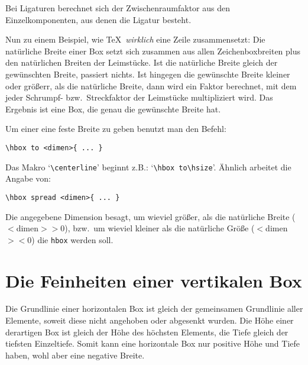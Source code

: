 Bei Ligaturen berechnet sich der
Zwischenraumfaktor aus den
Einzelkomponenten, aus denen die Ligatur besteht.

Nun zu einem Beispiel, wie \TeX\ {\em wirklich} eine Zeile
zusammensetzt: Die nat\"urliche Breite einer 
Box setzt sich zusammen aus
allen Zeichenboxbreiten plus den nat\"urlichen Breiten der Leimst\"ucke.
Ist die nat\"urliche Breite gleich der gew\"unschten Breite, passiert
nichts. Ist hingegen die gew\"unschte Breite kleiner oder gr\"o\ss{}err, als
die nat\"urliche Breite, dann wird ein Faktor berechnet, mit dem jeder
Schrumpf- bzw.\ Streckfaktor der Leimst\"ucke multipliziert wird. Das
Ergebnis ist eine Box, die genau die gew\"unschte Breite hat.

Um einer  eine feste Breite zu geben benutzt man den Befehl:
\begin{verbatim}
\hbox to <dimen>{ ... }
\end{verbatim}
Das Makro `\verb|\centerline|' beginnt z.B.: `\verb|\hbox to\hsize|'.
\"Ahnlich arbeitet die Angabe von:
\begin{verbatim}
\hbox spread <dimen>{ ... }
\end{verbatim}
Die angegebene 
Dimension besagt, um wieviel gr\"o\ss{}er, als die nat\"urliche
Breite ($<$dimen$> > 0$), bzw.\ um wieviel kleiner als die nat\"urliche
Gr\"o\ss{}e ($<$dimen$> < 0$) die {\tt hbox} werden soll.
\section{Die Feinheiten einer vertikalen Box}
Die 
Grundlinie einer horizontalen Box ist gleich der gemeinsamen
Grundlinie aller Elemente, soweit diese nicht angehoben oder abgesenkt
wurden. Die 
H\"ohe einer derartigen Box ist gleich der H\"ohe des h\"ochsten
Elements, die Tiefe gleich der tiefsten Einzeltiefe. Somit kann eine
horizontale Box nur positive H\"ohe und Tiefe haben, wohl aber eine
negative Breite.

